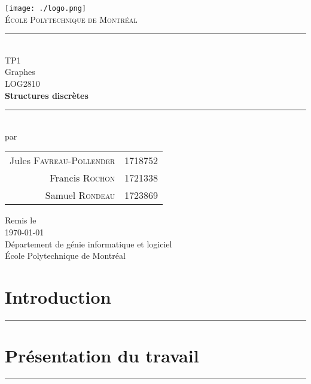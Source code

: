 \documentclass[10pt,letterpaper]{article}
\begin{document}
\begin{titlepage}
\begin{center}

\texttt{[image: ./logo.png]}~\\[1cm]

\textsc{\huge École Polytechnique de Montréal}\\[1.5cm]

\rule{0.5\linewidth}{0.5mm} \\[0.4cm]
{\LARGE TP1}\\[0.4cm]
{\Large Graphes}\\[1.0cm]

{\large LOG2810}\\[0.4cm]
{\large \textbf{Structures discrètes}}\\[0.4cm]

\rule{0.5\linewidth}{0.5mm} \\[1.0cm]

{\large par}\\[0.6cm]
\begin{Large}
  \begin{tabular}{r l}
    Jules \textsc{Favreau-Pollender} & 1718752\\[0.4cm]
    Francis \textsc{Rochon} & 1721338\\[0.4cm]
    Samuel \textsc{Rondeau} & 1723869\\[0.4cm]
  \end{tabular}
\end{Large}


\vfill

{\large Remis le}\\[0.3cm]
{\Large \today}\\[1.5cm]
{\large Département de génie informatique et logiciel}\\[0.3cm]
{\large École Polytechnique de Montréal}

\end{center}
\end{titlepage}

\section{Introduction}
\hrule
\vspace{1em}
\lipsum[1]

\vspace{1em}


\section{Présentation du travail}
\hrule
\vspace{1em}
\lipsum[2]
\end{document}
